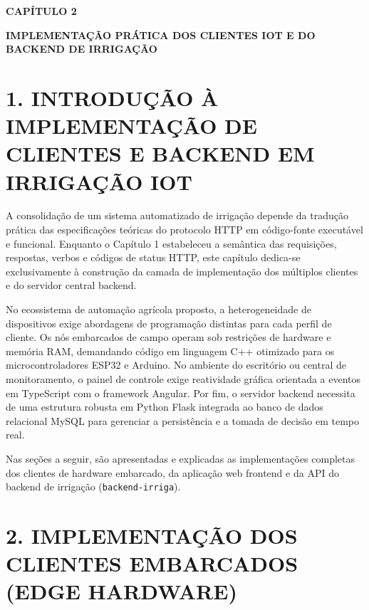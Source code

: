 
\begin{center}
\textbf{\fontsize{14}{16}\selectfont CAPÍTULO 2}

\vspace{0.5em}

\textbf{\fontsize{14}{16}\selectfont IMPLEMENTAÇÃO PRÁTICA DOS CLIENTES IOT E DO BACKEND DE IRRIGAÇÃO}
\end{center}

\vspace{1.5em}

\section*{1. INTRODUÇÃO À IMPLEMENTAÇÃO DE CLIENTES E BACKEND EM IRRIGAÇÃO IOT}

A consolidação de um sistema automatizado de irrigação depende da tradução prática das especificações teóricas do protocolo HTTP em código-fonte executável e funcional. Enquanto o Capítulo 1 estabeleceu a semântica das requisições, respostas, verbos e códigos de status HTTP, este capítulo dedica-se exclusivamente à construção da camada de implementação dos múltiplos clientes e do servidor central backend.

No ecossistema de automação agrícola proposto, a heterogeneidade de dispositivos exige abordagens de programação distintas para cada perfil de cliente. Os nós embarcados de campo operam sob restrições de hardware e memória RAM, demandando código em linguagem C++ otimizado para os microcontroladores ESP32 e Arduino. No ambiente do escritório ou central de monitoramento, o painel de controle exige reatividade gráfica orientada a eventos em TypeScript com o framework Angular. Por fim, o servidor backend necessita de uma estrutura robusta em Python Flask integrada ao banco de dados relacional MySQL para gerenciar a persistência e a tomada de decisão em tempo real.

Nas seções a seguir, são apresentadas e explicadas as implementações completas dos clientes de hardware embarcado, da aplicação web frontend e da API do backend de irrigação (\texttt{backend-irriga}).

\newpage

\section*{2. IMPLEMENTAÇÃO DOS CLIENTES EMBARCADOS (EDGE HARDWARE)}

